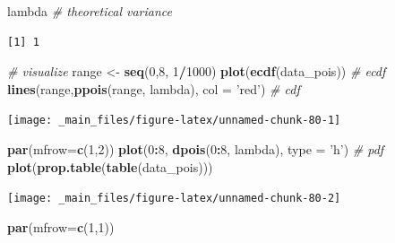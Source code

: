 \documentclass[
]{book}
\newenvironment{Shaded}{\begin{snugshade}}{\end{snugshade}}
\newcommand{\CommentTok}[1]{\textcolor[rgb]{0.56,0.35,0.01}{\textit{#1}}}
\newcommand{\DataTypeTok}[1]{\textcolor[rgb]{0.13,0.29,0.53}{#1}}
\newcommand{\DecValTok}[1]{\textcolor[rgb]{0.00,0.00,0.81}{#1}}
\newcommand{\KeywordTok}[1]{\textcolor[rgb]{0.13,0.29,0.53}{\textbf{#1}}}
\newcommand{\NormalTok}[1]{#1}
\newcommand{\OperatorTok}[1]{\textcolor[rgb]{0.81,0.36,0.00}{\textbf{#1}}}
\newcommand{\StringTok}[1]{\textcolor[rgb]{0.31,0.60,0.02}{#1}}
\begin{document}
\begin{Shaded}
\begin{Highlighting}[]
\NormalTok{lambda	    }\CommentTok{# theoretical variance}
\end{Highlighting}
\end{Shaded}

\begin{verbatim}
[1] 1
\end{verbatim}

\begin{Shaded}
\begin{Highlighting}[]
\CommentTok{# visualize}
\NormalTok{range  <-}\StringTok{ }\KeywordTok{seq}\NormalTok{(}\DecValTok{0}\NormalTok{,}\DecValTok{8}\NormalTok{, }\DecValTok{1}\OperatorTok{/}\DecValTok{1000}\NormalTok{)}
\KeywordTok{plot}\NormalTok{(}\KeywordTok{ecdf}\NormalTok{(data_pois))   }\CommentTok{# ecdf}
\KeywordTok{lines}\NormalTok{(range,}\KeywordTok{ppois}\NormalTok{(range, lambda), }\DataTypeTok{col =} \StringTok{'red'}\NormalTok{) }\CommentTok{# cdf}
\end{Highlighting}
\end{Shaded}

\begin{center}\texttt{[image: \_main\_files/figure-latex/unnamed-chunk-80-1]} \end{center}

\begin{Shaded}
\begin{Highlighting}[]
\KeywordTok{par}\NormalTok{(}\DataTypeTok{mfrow=}\KeywordTok{c}\NormalTok{(}\DecValTok{1}\NormalTok{,}\DecValTok{2}\NormalTok{))}
\KeywordTok{plot}\NormalTok{(}\DecValTok{0}\OperatorTok{:}\DecValTok{8}\NormalTok{, }\KeywordTok{dpois}\NormalTok{(}\DecValTok{0}\OperatorTok{:}\DecValTok{8}\NormalTok{, lambda), }\DataTypeTok{type =} \StringTok{'h'}\NormalTok{) }\CommentTok{# pdf}
\KeywordTok{plot}\NormalTok{(}\KeywordTok{prop.table}\NormalTok{(}\KeywordTok{table}\NormalTok{(data_pois)))}
\end{Highlighting}
\end{Shaded}

\begin{center}\texttt{[image: \_main\_files/figure-latex/unnamed-chunk-80-2]} \end{center}

\begin{Shaded}
\begin{Highlighting}[]
\KeywordTok{par}\NormalTok{(}\DataTypeTok{mfrow=}\KeywordTok{c}\NormalTok{(}\DecValTok{1}\NormalTok{,}\DecValTok{1}\NormalTok{))}
\end{Highlighting}
\end{Shaded}
\end{document}
